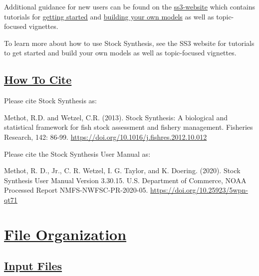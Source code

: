 Additional guidance for new users can be found on the \href{https://nmfs-ost.github.io/ss3-website/}{ss3-website} which contains tutorials for \href{https://nmfs-ost.github.io/ss3-website/qmds/getting_started_ss3.html}{getting started} and \href{https://github.com/nmfs-ost/ss3-source-code#how-can-i-learn-how-to-use-stock-synthesis}{building your own models} as well as topic-focused vignettes. 
 
To learn more about how to use Stock Synthesis, see the SS3 website for tutorials to get started and build your own models as well as topic-focused vignettes.

\hypertarget{HowToCite}{}
\subsection[How To Cite]{\protect\hyperlink{HowToCite}{How To Cite}}
Please cite Stock Synthesis as:

Methot, R.D. and Wetzel, C.R. (2013). Stock Synthesis: A biological and statistical
framework for fish stock assessment and fishery management. Fisheries Research, 
142: 86-99. \href{https://doi.org/10.1016/j.fishres.2012.10.012}{https://doi.org/10.1016/j.fishres.2012.10.012}

Please cite the Stock Synthesis User Manual as:

Methot, R. D., Jr., C. R. Wetzel, I. G. Taylor, and K. Doering. (2020). Stock Synthesis User Manual Version 3.30.15. U.S. Department of Commerce, NOAA Processed Report NMFS-NWFSC-PR-2020-05. \href{https://doi.org/10.25923/5wpn-qt71}{https://doi.org/10.25923/5wpn-qt71}

\pagebreak
		
\section[File Organization]{\protect\hyperref[FileOrganization]{File Organization}}\label{FileOrganization}
\hypertarget{InputFiles}{}
\subsection[Input File]{\protect\hyperlink{InputFiles}{Input Files}}

